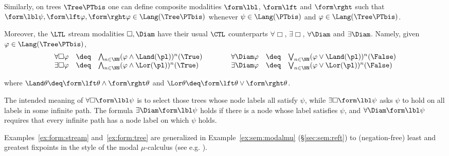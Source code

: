 \begin{example}
\label{ex:form:tree}
Similarly, on trees $\Tree\PTbis$ 
one can define composite modalities $\form\lbl$, $\form\lft$ and $\form\rght$
such that
$\form\lbl\psi, \form\lft\varphi, \form\rght\varphi \in \Lang(\Tree\PTbis)$
whenever $\psi \in \Lang(\PTbis)$ and $\varphi \in \Lang(\Tree\PTbis)$.

Moreover, the $\LTL$ stream modalities $\Box,\Diam$ have their 
usual $\CTL$ counterparts 
$\forall\Box$, $\exists\Box$,
$\forall\Diam$ and $\exists\Diam$.
Namely, given $\varphi \in \Lang(\Tree\PTbis)$,
\[
\begin{array}{r l l !{\qquad\quad} r l l}
  \forall \Box \varphi
& \deq
& \bigwedge_{n \in \NN} 
  (\varphi \land \Land(\pl))^n(\True)

& \forall\Diam \varphi
& \deq
& \bigvee_{n \in \NN} 
  (\varphi \lor \Land(\pl))^n(\False)
\\

  \exists \Box \varphi
& \deq
& \bigwedge_{n \in \NN} 
  (\varphi \land \Lor(\pl))^n(\True)

& \exists\Diam \varphi
& \deq
& \bigvee_{n \in \NN} 
  (\varphi \lor \Lor(\pl))^n(\False)
\end{array}
\]


\noindent
where
$\Land\theta \deq \form\lft \theta \land \form\rght \theta$
and
$\Lor\theta \deq \form\lft \theta \lor \form\rght \theta$.

The intended meaning of $\forall\Box \form\lbl\psi$ is to select
those trees whose node labels all satisfy $\psi$,
while $\exists\Box \form\lbl\psi$ asks $\psi$ to hold on all
labels in some infinite path.
The formula $\exists\Diam \form\lbl\psi$
holds if there is a node whose label satisfies $\psi$,
and $\forall\Diam \form\lbl\psi$ requires that every infinite path
has a node label on which $\psi$ holds.
\end{example}

Examples~\ref{ex:form:stream} and~\ref{ex:form:tree}
are generalized in Example~\ref{ex:sem:modalmu} (\S\ref{sec:sem:reft})
to (negation-free) least and greatest fixpoints 
in the style of the modal $\mu$-calculus
(see e.g. \cite{bs07chapter,bw18chapter}).




